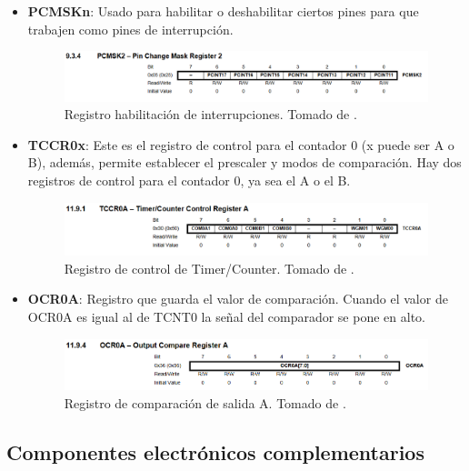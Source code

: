 \begin{itemize}
    \item \textbf{PCMSKn}: Usado para habilitar o deshabilitar ciertos pines para que trabajen como pines de interrupción.
    \begin{figure}[H]
        \centering
        \includegraphics[width=.9\linewidth]{Imagenes/PCMSK.png}
        \caption{Registro habilitación de interrupciones. Tomado de \cite{web}.}
        \label{fig7}
    \end{figure}

    \item \textbf{TCCR0x}: Este es el registro de control para el contador 0 (x puede ser A o B), además, permite establecer el prescaler y modos de comparación. Hay dos registros de control para el contador 0, ya sea el A o el B.
    \begin{figure}[H]
        \centering
        \includegraphics[width=.9\linewidth]{Imagenes/TCCR0A.png}
        \caption{Registro de control de Timer/Counter. Tomado de \cite{web}.}
        \label{fig8}
    \end{figure}

    \item \textbf{OCR0A}: Registro que guarda el valor de comparación. Cuando el valor de OCR0A es igual al de TCNT0 la señal del comparador se pone en alto.
    \begin{figure}[H]
        \centering
        \includegraphics[width=.9\linewidth]{Imagenes/OCR0A.png}
        \caption{Registro de comparación de salida A. Tomado de \cite{web}.}
        \label{fig9}
    \end{figure}
    
\end{itemize}

\subsection*{Componentes electrónicos complementarios}
